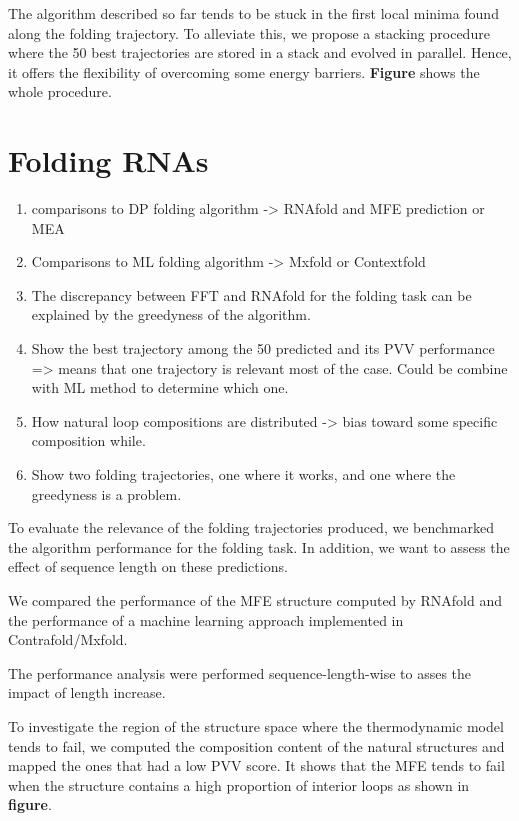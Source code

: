 \documentclass[a4paper,12pt]{article}
\begin{document}
{{The algorithm described so far tends to be stuck in the first local minima found
along the folding trajectory. To alleviate this, we propose a stacking procedure
where the 50 best trajectories are stored in a stack and evolved in parallel.
Hence, it offers the flexibility of overcoming some energy barriers. \textbf{Figure}
shows the whole procedure.

\clearpage
\section{Folding RNAs}
\label{sec:org0c55b0f}
\begin{enumerate}
\item comparisons to DP folding algorithm -> RNAfold and MFE prediction or MEA
\item Comparisons to ML folding algorithm -> Mxfold or Contextfold
\item The discrepancy between FFT and RNAfold for the folding task can be explained
by the greedyness of the algorithm.
\item Show the best trajectory among the 50 predicted and its PVV performance =>
means that one trajectory is relevant most of the case. Could be combine with
ML method to determine which one.
\item How natural loop compositions are distributed -> bias toward some specific
composition while.
\item Show two folding trajectories, one where it works, and one where the
greedyness is a problem.
\end{enumerate}

To evaluate the relevance of the folding trajectories produced, we benchmarked
the algorithm performance for the folding task. In addition, we want to assess
the effect of sequence length on these predictions.

We compared the performance of the MFE structure computed by RNAfold and the
performance of a machine learning approach implemented in Contrafold/Mxfold.

The performance analysis were performed sequence-length-wise to asses the impact
of length increase.

To investigate the region of the structure space where the thermodynamic model
tends to fail, we computed the composition content of the natural structures and
mapped the ones that had a low PVV score. It shows that the MFE tends to fail
when the structure contains a high proportion of interior loops as shown in
\textbf{figure}.

}}
\end{document}

